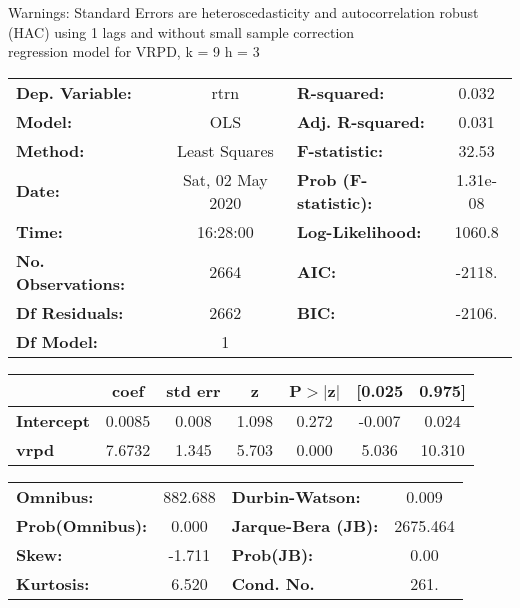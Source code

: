 Warnings: \newline
 [1] Standard Errors are heteroscedasticity and autocorrelation robust (HAC) using 1 lags and without small sample correction\\ 

regression model for VRPD, k = 9 h = 3\begin{center}
\begin{tabular}{lclc}
\toprule
\textbf{Dep. Variable:}    &       rtrn       & \textbf{  R-squared:         } &     0.032   \\
\textbf{Model:}            &       OLS        & \textbf{  Adj. R-squared:    } &     0.031   \\
\textbf{Method:}           &  Least Squares   & \textbf{  F-statistic:       } &     32.53   \\
\textbf{Date:}             & Sat, 02 May 2020 & \textbf{  Prob (F-statistic):} &  1.31e-08   \\
\textbf{Time:}             &     16:28:00     & \textbf{  Log-Likelihood:    } &    1060.8   \\
\textbf{No. Observations:} &        2664      & \textbf{  AIC:               } &    -2118.   \\
\textbf{Df Residuals:}     &        2662      & \textbf{  BIC:               } &    -2106.   \\
\textbf{Df Model:}         &           1      & \textbf{                     } &             \\
\bottomrule
\end{tabular}
\begin{tabular}{lcccccc}
                   & \textbf{coef} & \textbf{std err} & \textbf{z} & \textbf{P$> |$z$|$} & \textbf{[0.025} & \textbf{0.975]}  \\
\midrule
\textbf{Intercept} &       0.0085  &        0.008     &     1.098  &         0.272        &       -0.007    &        0.024     \\
\textbf{vrpd}      &       7.6732  &        1.345     &     5.703  &         0.000        &        5.036    &       10.310     \\
\bottomrule
\end{tabular}
\begin{tabular}{lclc}
\textbf{Omnibus:}       & 882.688 & \textbf{  Durbin-Watson:     } &    0.009  \\
\textbf{Prob(Omnibus):} &   0.000 & \textbf{  Jarque-Bera (JB):  } & 2675.464  \\
\textbf{Skew:}          &  -1.711 & \textbf{  Prob(JB):          } &     0.00  \\
\textbf{Kurtosis:}      &   6.520 & \textbf{  Cond. No.          } &     261.  \\
\bottomrule
\end{tabular}
\end{center}

